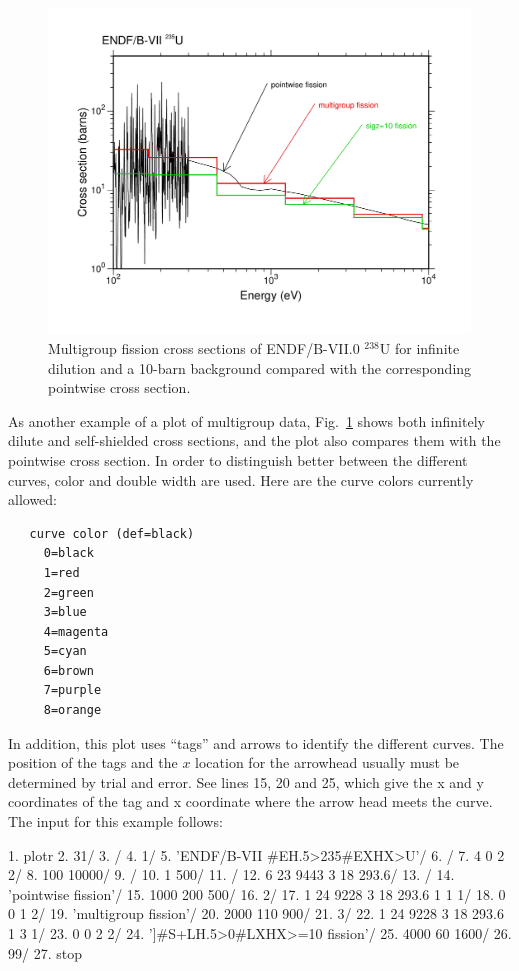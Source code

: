\begin{figure}[thb]\centering
\includegraphics[keepaspectratio, height=3.4in, angle=0]{figs/plotr6ack}
\caption[Sample plot displaying self-shielded cross sections]{Multigroup
 fission cross sections of ENDF/B-VII.0 $^{238}$U for infinite dilution and
 a 10-barn background compared with the corresponding pointwise
 cross section.}
\label{ss}
\end{figure}

As another example of a plot of multigroup data, Fig.~\ref{ss}
shows both infinitely dilute and self-shielded cross sections,
and the plot also compares them with the pointwise cross section.
In order to distinguish better between the different curves,
color and double width are used.  Here are the curve colors
currently allowed:

{
\begin{verbatim}
   curve color (def=black)
     0=black
     1=red
     2=green
     3=blue
     4=magenta
     5=cyan
     6=brown
     7=purple
     8=orange
\end{verbatim}}

In addition, this plot uses ``tags'' and arrows to identify the
different curves.  The position of the tags and the
$x$ location for the arrowhead usually must be determined by
trial and error.  See lines 15, 20 and 25, which give the x and
y coordinates of the tag and x coordinate where the arrow
head meets the curve.  The input for this example follows:

\newpage
\small
\begin{ccode}

  1.  plotr
  2.  31/
  3.  /
  4.  1/
  5.  'ENDF/B-VII #EH.5>235#EXHX>U'/
  6.  /
  7.  4 0 2 2/
  8.  100 10000/
  9.  /
 10.  1 500/
 11.  /
 12.  6 23 9443 3 18 293.6/
 13.  /
 14.  'pointwise fission'/
 15.  1000 200 500/
 16.  2/
 17.  1 24 9228 3 18 293.6 1 1 1/
 18.  0 0 1 2/
 19.  'multigroup fission'/
 20.  2000 110 900/
 21.  3/
 22.  1 24 9228 3 18 293.6 1 3 1/
 23.  0 0 2 2/
 24.  ']#S+LH.5>0#LXHX>=10 fission'/
 25.  4000 60 1600/
 26.  99/
 27.  stop

\end{ccode}
\normalsize

